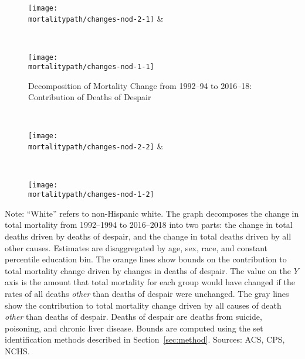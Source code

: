 \begin{figure}[H]
  \caption{Decomposition of Mortality Change from 1992--94 to 2016--18: \cnewline
    Contribution of Deaths of Despair}
  \label{fig:mort_causes}

  \begin{center}
     \\
  \end{center}
  \begin{center}
    \texttt{[image: \\mortalitypath/changes-nod-2-1]} &
  \end{center}

  \begin{center}
     \\
  \end{center}
  \begin{center}
    \texttt{[image: \\mortalitypath/changes-nod-1-1]} \\
  \end{center}
\end{figure}
\begin{figure}[H]\ContinuedFloat

  \begin{center}
     \\
  \end{center}
  \begin{center}
    \texttt{[image: \\mortalitypath/changes-nod-2-2]} &
  \end{center}
  \begin{center}
     \\
  \end{center}
  \begin{center}
    \texttt{[image: \\mortalitypath/changes-nod-1-2]} \\
  \end{center}
\end{figure}
\vspace{-1cm}
\scriptsize{Note: ``White'' refers to non-Hispanic white. The graph decomposes the change in total mortality from 1992--1994 to 2016--2018 into two parts: the change in total deaths driven by deaths of despair, and the change in total deaths driven by all other causes. Estimates are disaggregated by age, sex, race, and constant percentile education bin. The orange lines show bounds on the contribution to total mortality change driven by changes in deaths of despair. The value on the $Y$ axis is the amount that total mortality for each group would have changed if the rates of all deaths \textit{other} than deaths of despair were unchanged. The gray lines show the contribution to total mortality change driven by all causes of death \textit{other} than deaths of despair. Deaths of despair are deaths from suicide, poisoning, and chronic liver disease. Bounds are computed using the set identification methods described in Section~\ref{sec:method}. Sources: ACS, CPS, NCHS.}
